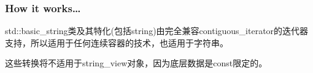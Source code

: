 \subsubsection{How it works…}

std::basic\_string类及其特化(包括string)由完全兼容contiguous\_iterator的迭代器支持，所以适用于任何连续容器的技术，也适用于字符串。

\begin{tcolorbox}[colback=webgreen!5!white,colframe=webgreen!75!black,title=Note]
这些转换将不适用于string\_view对象，因为底层数据是const限定的。
\end{tcolorbox}






















